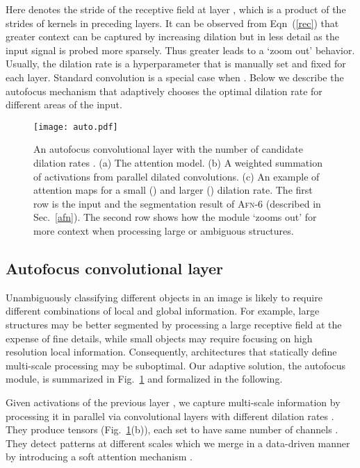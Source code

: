 \documentclass{llncs}
\begin{document}
Here  denotes the stride of the receptive field at layer , which is a product of the strides of kernels in preceding layers. It can be observed from Eqn~(\ref{rec}) that greater context can be captured by increasing dilation  but in less detail as the input signal is probed more sparsely. Thus greater  leads to a `zoom out' behavior. Usually, the dilation rate  is a hyperparameter that is manually set and fixed for each layer. Standard convolution is a special case when . Below we describe the autofocus mechanism that adaptively chooses the optimal dilation rate for different areas of the input.

\begin{figure}[t]
\center
\texttt{[image: auto.pdf]}
\vspace{-10mm}
\caption{An autofocus convolutional layer with the number of candidate dilation rates . (a) The attention model.
(b) A weighted summation of activations from parallel dilated convolutions. (c) An example of attention maps for a small () and larger () dilation rate. The first row is the input and the segmentation result of \textsc{Afn}-6 (described in Sec.~\ref{afn}). The second row shows how the module `zooms out' for more context when processing large or ambiguous structures.
}\label{resilient}
\vspace{-5mm}
\end{figure}
\vspace{-4mm}
\subsection{Autofocus convolutional layer}

Unambiguously classifying different objects in an image is likely to require different combinations of local and global information. For example, large structures may be better segmented by processing a large receptive field  at the expense of fine details, while small objects may require focusing on high resolution local information. Consequently, architectures that statically define multi-scale processing may be suboptimal. Our adaptive solution, the autofocus module, is summarized in Fig.~\ref{resilient} and formalized in the following.

Given activations of the previous layer , we capture multi-scale information by processing it in parallel via  convolutional layers with different dilation rates . They produce  tensors  (Fig.~\ref{resilient}(b)), each set to have same number of channels . They detect patterns at  different scales which we merge in a data-driven manner by introducing a soft attention mechanism \cite{bahdanau2014neural}.
\end{document}
